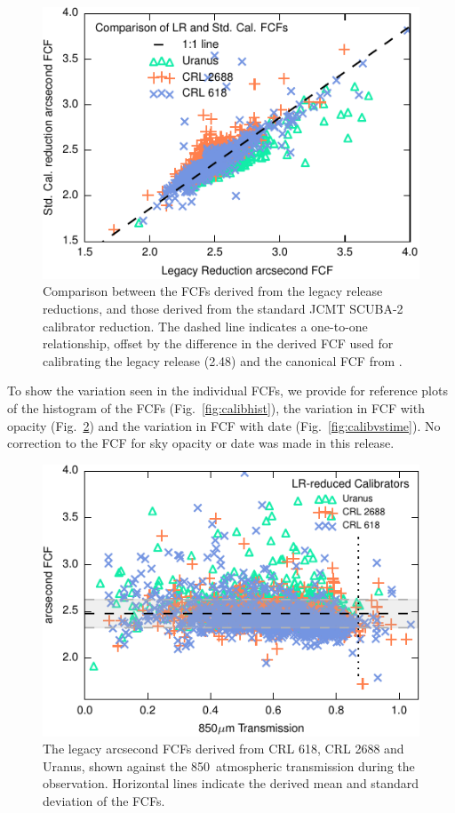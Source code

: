 \documentclass[twocolumn,times]{aastex6}
\begin{document}
\begin{figure}
\includegraphics{legacyFCF-caldbFCF-scatter.pdf}
\caption{Comparison between the FCFs derived from the legacy release
  reductions, and those derived from the standard JCMT SCUBA-2
  calibrator reduction. The dashed line indicates a one-to-one
  relationship, offset by the difference in the derived FCF used for
  calibrating the legacy release (2.48) and the canonical FCF from
  \citet[2.34]{Dempsey2013}. \label{fig:lr-caldb-scatter} }
\end{figure}


To show the variation seen in the individual FCFs, we provide for
reference plots of the histogram of the FCFs
(Fig.~\ref{fig:calibhist}), the variation in FCF with opacity
(Fig.~\ref{fig:calibvstrans}) and the variation in FCF with date
(Fig.~\ref{fig:calibvstime}). No correction to the FCF for sky opacity or date
was made in this release.

\begin{figure}
\includegraphics{legacyFCF-vs-transmission.pdf}
\caption{The legacy arcsecond FCFs derived from CRL 618, CRL 2688 and
  Uranus, shown against the 850\micron\ atmospheric transmission
  during the observation. Horizontal lines indicate the derived mean
  and standard deviation of the FCFs.\label{fig:calibvstrans}}
\end{figure}
\end{document}

